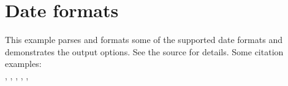 \documentclass[a4paper]{article}
\begin{document}
\section*{Date formats}

This example parses and formats some of the supported date formats and
demonstrates the output options. See the source for details. Some citation examples:\\
\noindent\cite{date1}, \cite{date2}, \cite{date3}, \cite{date4}, \cite{date5}, \cite{date6}

\printbibliography[env=simple,title={Examples}]
\end{document}
